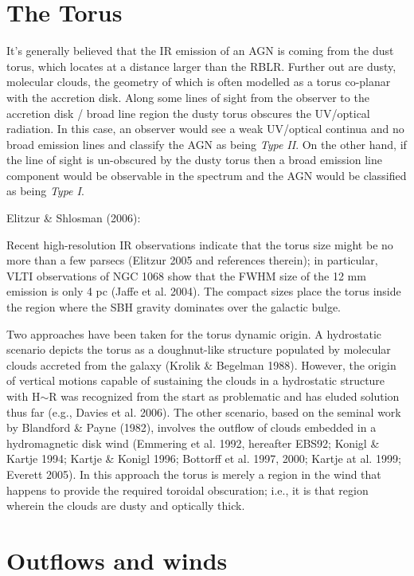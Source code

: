 \section{The Torus}

It’s generally believed that the IR emission of an AGN is coming from the dust torus, which
locates at a distance larger than the RBLR. 
Further out are dusty, molecular clouds, the geometry of which is often modelled as a torus co-planar with the accretion disk. 
Along some lines of sight from the observer to the accretion disk / broad line region the dusty torus obscures the UV/optical radiation. 
In this case, an observer would see a weak UV/optical continua and no broad emission lines and classify the AGN as being {\it Type II}. 
On the other hand, if the line of sight is un-obscured by the dusty torus then a broad emission line component would be observable in the spectrum and the AGN would be classified as being {\it Type I}. 

Elitzur \& Shlosman (2006): 

Recent high-resolution IR observations indicate that the torus size might be no more than a few parsecs (Elitzur 2005 and references therein); in particular, VLTI observations of NGC 1068 show that the FWHM size of the 12 mm emission is only 4 pc (Jaffe et al. 2004). 
The compact sizes place the torus inside the region where the SBH gravity dominates over the galactic bulge.

Two approaches have been taken for the torus dynamic origin. 
A hydrostatic scenario depicts the torus as a doughnut-like structure populated by molecular clouds accreted from the galaxy (Krolik \& Begelman 1988). 
However, the origin of vertical motions capable of sustaining the clouds in a hydrostatic structure with H$\sim$R was recognized from the start as problematic and has eluded solution thus far (e.g., Davies et al. 2006). 
The other scenario, based on the seminal work by Blandford \& Payne (1982), involves the outflow of clouds embedded in a hydromagnetic disk wind (Emmering et al. 1992, hereafter EBS92; Konigl \& Kartje 1994; Kartje \& Konigl 1996; Bottorff et al. 1997, 2000; Kartje at al. 1999; Everett 2005). 
In this approach the torus is merely a region in the wind that happens to provide the required toroidal obscuration; i.e., it is that region wherein the clouds are dusty and optically thick.

\section{Outflows and winds}

